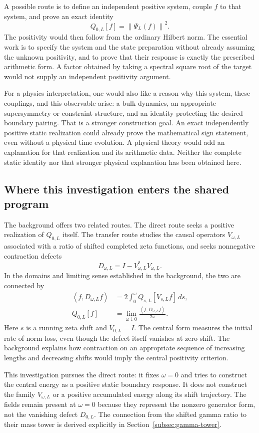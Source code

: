 \documentclass[11pt]{article}
\numberwithin{equation}{section}
\theoremstyle{definition}
\theoremstyle{remark}
\newcommand{\norm}[1]{\left\lVert#1\right\rVert}
\newcommand{\ip}[2]{\left\langle#1,#2\right\rangle}
\begin{document}
A possible route is to define an independent positive system, couple $f$ to that system, and prove an exact identity
\[
Q_{0,L}[f]=\norm{\Psi_L(f)}^2.
\]
The positivity would then follow from the ordinary Hilbert norm. The essential work is to specify the system and the state preparation without already assuming the unknown positivity, and to prove that their response is exactly the prescribed arithmetic form. A factor obtained by taking a spectral square root of the target would not supply an independent positivity argument.

For a physics interpretation, one would also like a reason why this system, these couplings, and this observable arise: a bulk dynamics, an appropriate supersymmetry or constraint structure, and an identity protecting the desired boundary pairing. That is a stronger construction goal. An exact independently positive static realization could already prove the mathematical sign statement, even without a physical time evolution. A physical theory would add an explanation for that realization and its arithmetic data. Neither the complete static identity nor that stronger physical explanation has been obtained here.

\subsection*{Where this investigation enters the shared program}
The background offers two related routes. The direct route seeks a positive realization of $Q_{0,L}$ itself. The transfer route studies the causal operators $V_{\omega,L}$ associated with a ratio of shifted completed zeta functions, and seeks nonnegative contraction defects
\[
D_{\omega,L}=I-V_{\omega,L}^*V_{\omega,L}.
\]
In the domains and limiting sense established in the background, the two are connected by
\[
\begin{aligned}
\ip{f}{D_{\omega,L}f}
 &=2\int_0^\omega Q_{s,L}[V_{s,L}f]\,ds,\\
Q_{0,L}[f]
 &=\lim_{\omega\downarrow0}\frac{\ip{f}{D_{\omega,L}f}}{2\omega}.
\end{aligned}
\]
Here $s$ is a running zeta shift and $V_{0,L}=I$. The central form measures the initial rate of norm loss, even though the defect itself vanishes at zero shift. The background explains how contraction on an appropriate sequence of increasing lengths and decreasing shifts would imply the central positivity criterion.

This investigation pursues the direct route: it fixes $\omega=0$ and tries to construct the central energy as a positive static boundary response. It does not construct the family $V_{\omega,L}$ or a positive accumulated energy along its shift trajectory. The fields remain present at $\omega=0$ because they represent the nonzero generator form, not the vanishing defect $D_{0,L}$. The connection from the shifted gamma ratio to their mass tower is derived explicitly in Section~\ref{subsec:gamma-tower}.
\end{document}
